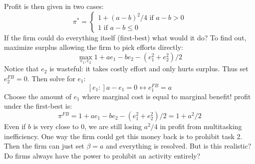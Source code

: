 \documentclass{article}
\begin{document}
Profit is then given in two cases:
\[\pi^* = \begin{cases}1+(a-b)^2/4\text{ if } a-b>0\\
1 \text{ if } a-b\leq 0\end{cases}\]
If the firm could do everything itself (first-best) what would it do? To find out, maximize surplus allowing the firm to pick efforts directly:
\[\max_{e_1, e_2} 1+ ae_1 -be_2 -(e_1^2+e_2^2)/2\]
Notice that $e_2$ is wasteful: it takes costly effort and only hurts surplus. Thus set $e_2^{FB}=0$. Then solve for $e_1$:
\[[e_1:] a -e_1=0 \leftrightarrow e_1^{FB}=a\]
Choose the amount of $e_1$ where marginal cost is equal to marginal benefit! profit under the first-best is:
\[\pi^{FB} = 1+ ae_1 -be_2 -(e_1^2+e_2^2)/2 = 1+a^2/2\]
Even if $b$ is very close to 0, we are still losing $a^2/4$ in profit from multitasking inefficiency. One way the firm could get this money back is to prohibit task 2. Then the firm can just set $\beta=a$ and everything is resolved. But is this realistic? Do firms always have the power to prohibit an activity entirely?
\end{document}
